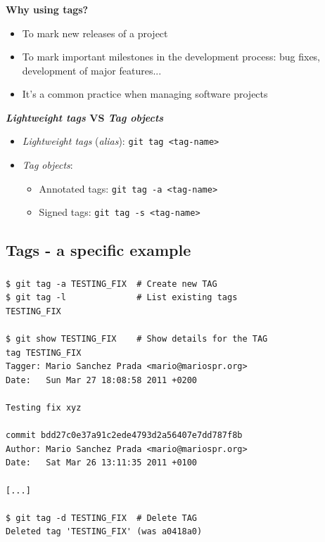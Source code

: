 \begin{frame}
  \frametitle{\insertsubsection}

  \textbf{Why using tags?}
  \begin{itemize}
  \item To mark new releases of a project\\
    \vspacing
  \item To mark important milestones in the development process:
    bug fixes, development of major features...\\
    \vspacing
  \item It's a common practice when managing software projects\\
    \vspacing
  \end{itemize}

  \textbf{\textit{Lightweight tags} VS \textit{Tag objects}}
  \begin{itemize}
  \item \textit{Lightweight tags} (\textit{alias}): \texttt{git tag <tag-name>}\\
    \vspacing
  \item \textit{Tag objects}:
    \begin{itemize}
    \item Annotated tags: \texttt{git tag -a <tag-name>}\\
      \vspacing
    \item Signed tags: \texttt{git tag -s <tag-name>}\\
      \vspacing
    \end{itemize}
  \end{itemize}

\end{frame}

\subsection{Tags - a specific example}
\begin{frame}[fragile]
  \frametitle{\insertsubsection}

  \begin{small}
\begin{verbatim}
$ git tag -a TESTING_FIX  # Create new TAG
$ git tag -l              # List existing tags
TESTING_FIX

$ git show TESTING_FIX    # Show details for the TAG
tag TESTING_FIX
Tagger: Mario Sanchez Prada <mario@mariospr.org>
Date:   Sun Mar 27 18:08:58 2011 +0200

Testing fix xyz

commit bdd27c0e37a91c2ede4793d2a56407e7dd787f8b
Author: Mario Sanchez Prada <mario@mariospr.org>
Date:   Sat Mar 26 13:11:35 2011 +0100

[...]

$ git tag -d TESTING_FIX  # Delete TAG
Deleted tag 'TESTING_FIX' (was a0418a0)
\end{verbatim}
  \end{small}

\end{frame}


